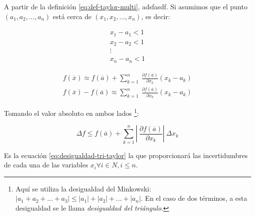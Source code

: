 A partir de la definición \ref{eq:def-taylor-multi}, adsfasdf. Si asumimos que
el punto $(a_1, a_2, ..., a_n)$ está cerca de $(x_1, x_2, ..., x_n)$, es decir:

\begin{align*}
	x_1 - a_1 < 1 \\
	x_2 - a_2 < 1 \\
	\vdots \\
	x_n - a_n < 1
\end{align*}

\begin{align*}
	f(\overline{x}) \approx f(\overline{a}) + \sum_{k=1}^{n} \
		\frac{\partial f(\overline{a})}{\partial x_k} (x_k - a_k) \\
	f(\overline{x}) - f(\overline{a}) \approx \sum_{k=1}^{n} \
		\frac{\partial f(\overline{a})}{\partial x_k} (x_k - a_k)
\end{align*}

Tomando el valor absoluto en ambos lados \footnote{Aquí se utiliza la
desigualdad del Minkowski: $|a_1 + a_2 + ... + a_3| \leq |a_1| + |a_2| + ... +
|a_n|$. En el caso de dos términos, a esta desigualdad se le llama
\textit{desigualdad del triángulo}.}:

\begin{equation} \label{eq:desigualdad-tri-taylor}
	\Delta f \leq f(\overline{a}) + \sum_{k=1}^{n} \left |\ 
		\frac{\partial f(\overline{a})}{\partial x_k} \right| \
		\Delta x_k
\end{equation}

Es la ecuación \ref{eq:desigualdad-tri-taylor} la que proporcionará las
incertidumbres de cada una de las variables $x_i \forall i \in N, i \leq n$.


